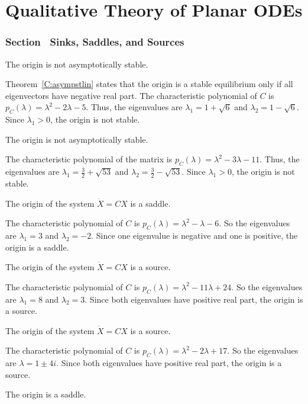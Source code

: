 \chapter{Qualitative Theory of Planar ODEs}

\subsection*{Section~\protect{\ref{S:6.7}} Sinks, Saddles, and Sources}

 \ans The origin is not asymptotically stable.

\soln Theorem~\ref{C:asympstlin} states that the origin is a stable
equilibrium only if all eigenvectors have negative real part.  The
characteristic polynomial of $C$ is $p_C(\lambda) = \lambda^2 - 2\lambda
- 5$.  Thus, the eigenvalues are $\lambda_1 = 1 + \sqrt{6}$ and
$\lambda_2 = 1 - \sqrt{6}$. Since $\lambda_1 > 0$, the origin
is not stable.

 \ans The origin is not asymptotically stable.

\soln The characteristic polynomial of the matrix is $p_C(\lambda) =
\lambda^2 - 3\lambda - 11$.  Thus, the eigenvalues are $\lambda_1 =
\frac{3}{2} + \sqrt{53}$ and $\lambda_2 = \frac{3}{2} - \sqrt{53}$.
Since $\lambda_1 > 0$, the origin is not stable.

 \ans The origin of the system $\dot{X} = CX$ is a saddle.

\soln The characteristic polynomial of $C$ is
$p_C(\lambda) = \lambda^2 - \lambda - 6$.  So the eigenvalues are
$\lambda_1 = 3$ and $\lambda_2 = -2$.  Since one eigenvalue is negative
and one is positive, the origin is a saddle.

 \ans The origin of the system $\dot{X} = CX$ is a source.

\soln The characteristic polynomial of $C$ is
$p_C(\lambda) = \lambda^2 - 11\lambda + 24$.  So the eigenvalues are
$\lambda_1 = 8$ and $\lambda_2 = 3$.  Since both eigenvalues have
positive real part, the origin is a source.

 \ans The origin of the system $\dot{X} = CX$ is a source.

\soln The characteristic polynomial of $C$ is
$p_C(\lambda) = \lambda^2 - 2\lambda + 17$.  So the eigenvalues are
$\lambda = 1 \pm 4i$.  Since both eigenvalues have positive real part,
the origin is a source.

\newpage
{} \ans The origin is a saddle.

